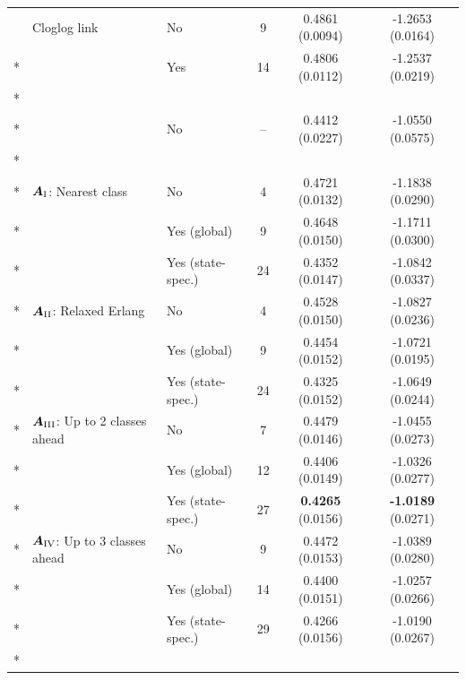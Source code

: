 \begin{longtable}[t]{>{}lllccc}
\addlinespace[0.5em]
\nopagebreak
\hspace{1em} & Cloglog link & No & 9 & 0.4861 (0.0094) & -1.2653 (0.0164)\\*
\nopagebreak
\hspace{1em} &  & Yes & 14 & 0.4806 (0.0112) & -1.2537 (0.0219)\\*
\cmidrule{1-6}
\addlinespace[0.3em]
\multicolumn{6}{l}{\textbf{\textbf{Discrete-time Markov chain}}}\\*
\hspace{1em} &  & No & -- & 0.4412 (0.0227) & -1.0550 (0.0575)\\*
\cmidrule{1-6}
\addlinespace[0.3em]
\multicolumn{6}{l}{\textbf{\textbf{Markov jump process}}}\\*
\hspace{1em} & $\bm{A}_{\RN{1}}$: Nearest class & No & 4 & 0.4721 (0.0132) & -1.1838 (0.0290)\\*
\nopagebreak
\hspace{1em} &  & Yes (global) & 9 & 0.4648 (0.0150) & -1.1711 (0.0300)\\*
\nopagebreak
\hspace{1em} &  & Yes (state-spec.) & 24 & 0.4352 (0.0147) & -1.0842 (0.0337)\\*

\addlinespace[0.5em]
\nopagebreak
\hspace{1em} & $\bm{A}_{\RN{2}}$: Relaxed Erlang & No & 4 & 0.4528 (0.0150) & -1.0827 (0.0236)\\*
\nopagebreak
\hspace{1em} &  & Yes (global) & 9 & 0.4454 (0.0152) & -1.0721 (0.0195)\\*
\nopagebreak
\hspace{1em} &  & Yes (state-spec.) & 24 & 0.4325 (0.0152) & -1.0649 (0.0244)\\*

\addlinespace[0.5em]
\nopagebreak
\hspace{1em} & $\bm{A}_{\RN{3}}$: Up to 2 classes ahead & No & 7 & 0.4479 (0.0146) & -1.0455 (0.0273)\\*
\nopagebreak
\hspace{1em} &  & Yes (global) & 12 & 0.4406 (0.0149) & -1.0326 (0.0277)\\*
\nopagebreak
\hspace{1em} &  & Yes (state-spec.) & 27 & \textbf{0.4265} (0.0156) & \textbf{-1.0189} (0.0271)\\*

\addlinespace[0.5em]
\nopagebreak
\hspace{1em} & $\bm{A}_{\RN{4}}$: Up to 3 classes ahead & No & 9 & 0.4472 (0.0153) & -1.0389 (0.0280)\\*
\nopagebreak
\hspace{1em} &  & Yes (global) & 14 & 0.4400 (0.0151) & -1.0257 (0.0266)\\*
\nopagebreak
\hspace{1em} &  & Yes (state-spec.) & 29 & 0.4266 (0.0156) & -1.0190 (0.0267)\\*


\end{longtable}
